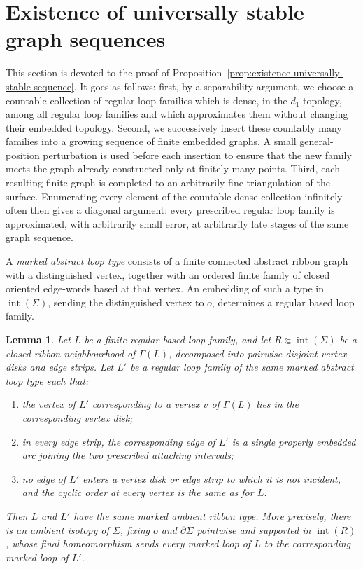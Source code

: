 \documentclass[11pt,a4paper,reqno]{article}
\newtheorem{lemma}[theorem]{Lemma}
\theoremstyle{definition}
\theoremstyle{remark}
\begin{document}
\section{Existence of universally stable graph sequences}\label{sec:proof_prop_univ_stable}

This section is devoted to the proof of Proposition~\ref{prop:existence-universally-stable-sequence}. It goes as follows: first, by a separability argument, we choose a countable collection of regular loop families which is dense, in the $d_1$-topology, among all regular loop families and which approximates them without changing their embedded topology. Second, we successively insert these countably many families into a growing sequence of finite embedded graphs. A small general-position perturbation is used before each insertion to ensure that the new family meets the graph already constructed only at finitely many points. Third, each resulting finite graph is completed to an arbitrarily fine triangulation of the surface. Enumerating every element of the countable dense collection infinitely often then gives a diagonal argument: every prescribed regular loop family is approximated, with arbitrarily small error, at arbitrarily late stages of the same graph sequence.

A \emph{marked abstract loop type} consists of a finite connected abstract ribbon graph with a distinguished vertex, together with an ordered finite family of closed oriented edge-words based at that vertex. An embedding of such a type in $\operatorname{int}(\Sigma)$, sending the distinguished vertex to $o$, determines a regular based loop family.

\begin{lemma}\label{lem:ribbon-neighbourhood-isotopy}
Let $L$ be a finite regular based loop family, and let $R\Subset\operatorname{int}(\Sigma)$ be a closed ribbon neighbourhood of $\Gamma(L)$, decomposed into pairwise disjoint vertex disks and edge strips. Let $L'$ be a regular loop family of the same marked abstract loop type such that:
\begin{enumerate}
\item the vertex of $L'$ corresponding to a vertex $v$ of $\Gamma(L)$ lies in the corresponding vertex disk;
\item in every edge strip, the corresponding edge of $L'$ is a single properly embedded arc joining the two prescribed attaching intervals;
\item no edge of $L'$ enters a vertex disk or edge strip to which it is not incident, and the cyclic order at every vertex is the same as for $L$.
\end{enumerate}
Then $L$ and $L'$ have the same marked ambient ribbon type. More precisely, there is an ambient isotopy of $\Sigma$, fixing $o$ and $\partial\Sigma$ pointwise and supported in $\operatorname{int}(R)$, whose final homeomorphism sends every marked loop of $L$ to the corresponding marked loop of $L'$.
\end{lemma}
\end{document}
